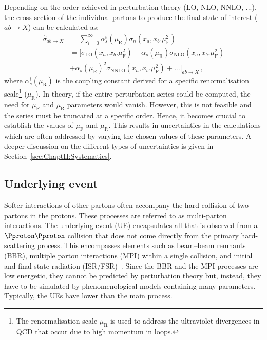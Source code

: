 Depending on the order achieved in perturbation theory (LO, NLO, NNLO, ...), the cross-section 
of the individual partons to produce the final state of interest
($ab \rightarrow X$) can be calculated as:
\begin{align*}
	\hat{\sigma}_{ab\rightarrow X} 	&= \sum_{i=0}^{\infty} \alpha_{s}^{i}(\mu_{\text{R}}) \sigma_{n}(x_{a}, x_{b}. \mu_{\text{F}}^{2}) \\ 
							&=[\sigma_{\text{LO}}(x_{a}, x_{b}. \mu_{\text{F}}^{2}) + \alpha_{s}(\mu_{\text{R}}) \sigma_{\text{NLO}}(x_{a}, x_{b}. \mu_{\text{F}}^{2})  \\
							&+ \alpha_{s}(\mu_{\text{R}})^{2} \sigma_{\text{NNLO}}(x_{a}, x_{b}. \mu_{\text{F}}^{2}) + ...]_{ab\rightarrow X} \, ,
\end{align*}
where $\alpha_{s}^{i}(\mu_{\text{R}})$ is the coupling constant derived for a specific renormalisation scale\footnote{The 
renormalisation scale $\mu_{\text{R}}$ is used to address the ultraviolet divergences in QCD that occur due to high 
momentum in loops.} ($\mu_{\text{R}}$). 
In theory, if the entire perturbation series could be computed, the need for $\mu_{\text{F}}$ and $\mu_{\text{R}}$ parameters 
would vanish. However, this is not feasible and the series must be truncated at a specific order. Hence, it 
becomes crucial to establish the values of $\mu_{\text{F}}$ and $\mu_{\text{R}}$. This results in uncertainties in the calculations 
which are often addressed by varying the chosen values of these parameters. A deeper discussion on the
different types of uncertainties is given in Section~\ref{sec:ChaptH:Systematics}.


\subsection{Underlying event}
\label{sec:Chap1:PhenoOfPP:UE}
Softer interactions of other partons often accompany the hard collision of two partons
in the protons. These processes are referred to as multi-parton interactions.
The underlying event (UE) encapsulates all that is observed from a $\Pproton\Pproton$ 
collision that does not come directly
from the primary hard-scattering process. This encompasses elements such as beam--beam remnants (BBR), 
multiple parton interactions (MPI) within a single collision, and initial and final state radiation (ISR/FSR)~\cite{Hoche:2014rga}. 
Since the BBR and the MPI processes are low
energetic, they cannot be predicted by perturbation theory but, instead, they have to be
simulated by phenomenological models containing many parameters. 
Typically, the UEs have lower \pT than the main process.

